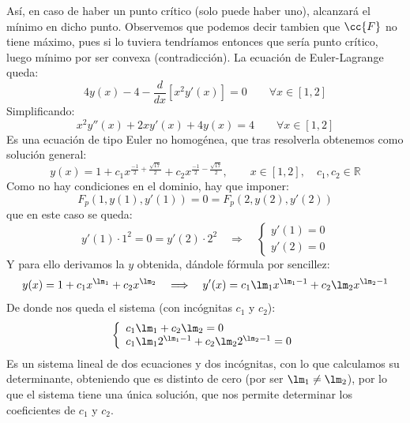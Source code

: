 \begin{ejemplo}
    \noindent
    Así, en caso de haber un punto crítico (solo puede haber uno), alcanzará el mínimo en dicho punto. Observemos que podemos decir tambien que $\cc{F}$ no tiene máximo, pues si lo tuviera tendríamos entonces que sería punto crítico, luego mínimo por ser convexa (contradicción). La ecuación de Euler-Lagrange queda:
    \begin{equation*}
        4y(x) - 4 - \frac{d}{dx}[x^2 y'(x)] = 0 \qquad \forall x\in [1,2]
    \end{equation*}
    Simplificando:
    \begin{equation*}
        x^2y''(x) + 2xy'(x) + 4y(x) = 4 \qquad \forall x\in [1,2]
    \end{equation*}
    Es una ecuación de tipo Euler no homogénea, que tras resolverla obtenemos como solución general:
    \begin{equation*}
        y(x) = 1 + c_1x^{\frac{-1}{2}+\frac{\sqrt{17}}{2}} + c_2x^{\frac{-1}{2}-\frac{\sqrt{17}}{2}}, \qquad x\in [1,2],\quad  c_1,c_2\in \mathbb{R}
    \end{equation*}
    Como no hay condiciones en el dominio, hay que imponer:
    \begin{equation*}
        F_p(1,y(1),y'(1)) = 0 = F_p(2,y(2),y'(2))
    \end{equation*}
    que en este caso se queda:
    \begin{equation*}
        y'(1)\cdot 1^2 = 0 = y'(2)\cdot 2^2 \quad\Longrightarrow\quad \left\{\begin{array}{l}
            y'(1) = 0 \\
            y'(2) = 0 
        \end{array}\right.
    \end{equation*}
    Y para ello derivamos la $y$ obtenida, dándole fórmula por sencillez:
    \begin{equation*}
        y(x) = 1+c_1 x^{\lm_1} + c_2 x^{\lm_2} \quad\Longrightarrow\quad y'(x) = c_1\lm_1 x^{\lm_1 - 1} + c_2 \lm_2 x^{\lm_2 - 1}
    \end{equation*}
    De donde nos queda el sistema (con incógnitas $c_1$ y $c_2$):
    \begin{equation*}
        \left\{\begin{array}{l}
            c_1\lm_1 + c_2 \lm_2 = 0 \\
            c_1\lm_1 2^{\lm_1-1} + c_2\lm_2 2^{\lm_2 - 1} = 0
        \end{array}\right.
    \end{equation*}
    Es un sistema lineal de dos ecuaciones y dos incógnitas, con lo que calculamos su determinante, obteniendo que es distinto de cero (por ser $\lm_1 \neq \lm_2$), por lo que el sistema tiene una única solución, que nos permite determinar los coeficientes de $c_1$ y $c_2$.
\end{ejemplo}

